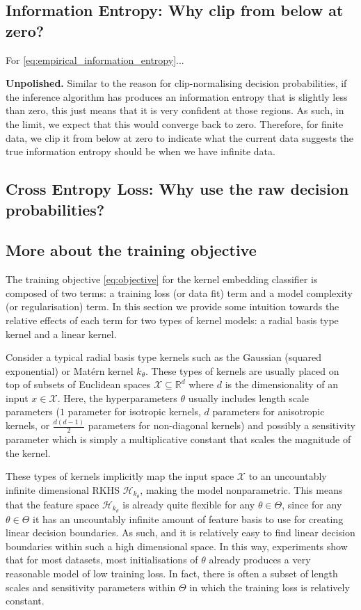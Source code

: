 \documentclass{article}
\newcommand{\note}[1]{{\color{orange} #1}}
\begin{document}
	\subsection{Information Entropy: Why clip from below at zero?}
	
		For \eqref{eq:empirical_information_entropy}...
		
		\note{\textbf{Unpolished.}} Similar to the reason for clip-normalising decision probabilities, if the inference algorithm has produces an information entropy that is slightly less than zero, this just means that it is very confident at those regions. As such, in the limit, we expect that this would converge back to zero. Therefore, for finite data, we clip it from below at zero to indicate what the current data suggests the true information entropy should be when we have infinite data.
		
	\subsection{Cross Entropy Loss: Why use the raw decision probabilities?}
	
		
	\subsection{More about the training objective}
	
		The training objective \eqref{eq:objective} for the kernel embedding classifier is composed of two terms: a training loss (or data fit) term and a model complexity (or regularisation) term. In this section we provide some intuition towards the relative effects of each term for two types of kernel models: a radial basis type kernel and a linear kernel.
		
		Consider a typical radial basis type kernels such as the Gaussian (squared exponential) or Mat\'{e}rn kernel $k_{\theta}$. These types of kernels are usually placed on top of subsets of Euclidean spaces $\mathcal{X} \subseteq \mathbb{R}^{d}$ where $d$ is the dimensionality of an input $x \in \mathcal{X}$. Here, the hyperparameters $\theta$ usually includes length scale parameters ($1$ parameter for isotropic kernels, $d$ parameters for anisotropic kernels, or $\frac{d (d - 1)}{2}$ parameters for non-diagonal kernels) and possibly a sensitivity parameter which is simply a multiplicative constant that scales the magnitude of the kernel.
		
		These types of kernels implicitly map the input space $\mathcal{X}$ to an uncountably infinite dimensional RKHS $\mathcal{H}_{k_{\theta}}$, making the model nonparametric. This means that the feature space $\mathcal{H}_{k_{\theta}}$ is already quite flexible for any $\theta \in \Theta$, since for any $\theta \in \Theta$ it has an uncountably infinite amount of feature basis to use for creating linear decision boundaries. As such, and it is relatively easy to find linear decision boundaries within such a high dimensional space. In this way, experiments show that for most datasets, most initialisations of $\theta$ already produces a very reasonable model of low training loss. In fact, there is often a subset of length scales and sensitivity parameters within $\Theta$ in which the training loss is relatively constant.
		
\end{document}
